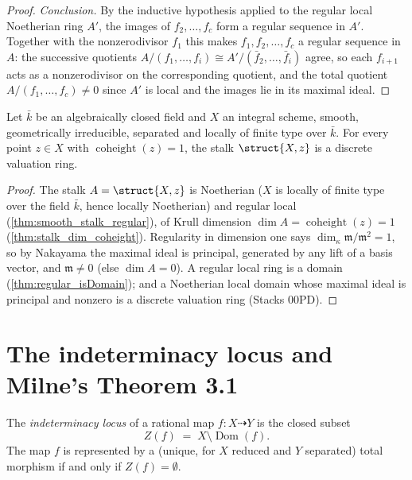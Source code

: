 \begin{proof}
  \emph{Conclusion.} By the inductive hypothesis applied to the regular local
  Noetherian ring \(A'\), the images of \(f_2, \dots, f_c\) form a regular
  sequence in \(A'\). Together with the nonzerodivisor \(f_1\) this makes
  \(f_1, f_2, \dots, f_c\) a regular sequence in \(A\): the successive
  quotients \(A/(f_1, \dots, f_i) \cong A'/(\bar f_2, \dots, \bar f_i)\) agree,
  so each \(f_{i+1}\) acts as a nonzerodivisor on the corresponding quotient,
  and the total quotient \(A/(f_1, \dots, f_c) \neq 0\) since \(A'\) is local
  and the images lie in its maximal ideal.
\end{proof}

\begin{theorem}
  \label{thm:smooth_codim_one_dvr}
  \leanok
  Let \(\bar k\) be an algebraically closed field and \(X\) an integral scheme,
  smooth, geometrically irreducible, separated and locally of finite type over
  \(\bar k\). For every point \(z \in X\) with
  \(\operatorname{coheight}(z) = 1\), the stalk \(\struct{X,z}\) is a discrete
  valuation ring.
\end{theorem}
\begin{proof}
  \leanok
  The stalk \(A = \struct{X,z}\) is Noetherian (\(X\) is locally of finite
  type over the field \(\bar k\), hence locally Noetherian) and regular local
  (\ref{thm:smooth_stalk_regular}), of Krull dimension
  \(\dim A = \operatorname{coheight}(z) = 1\)
  (\ref{thm:stalk_dim_coheight}). Regularity in dimension one says
  \(\dim_\kappa \mathfrak m/\mathfrak m^2 = 1\), so by Nakayama the maximal
  ideal is principal, generated by any lift of a basis vector, and
  \(\mathfrak m \neq 0\) (else \(\dim A = 0\)). A regular local ring is a
  domain (\ref{thm:regular_isDomain}); and a Noetherian local domain whose
  maximal ideal is principal and nonzero is a discrete valuation ring
  (Stacks 00PD).
\end{proof}

\section{The indeterminacy locus and Milne's Theorem 3.1}
\label{sec:indeterminacy}

\begin{definition}
  \label{def:indeterminacy_locus}
  \leanok
  The \emph{indeterminacy locus} of a rational map
  \(f : X \dashrightarrow Y\) is the closed subset
  \[
    Z(f) \;=\; X \setminus \operatorname{Dom}(f).
  \]
  The map \(f\) is represented by a (unique, for \(X\) reduced and \(Y\)
  separated) total morphism if and only if \(Z(f) = \emptyset\).
\end{definition}


